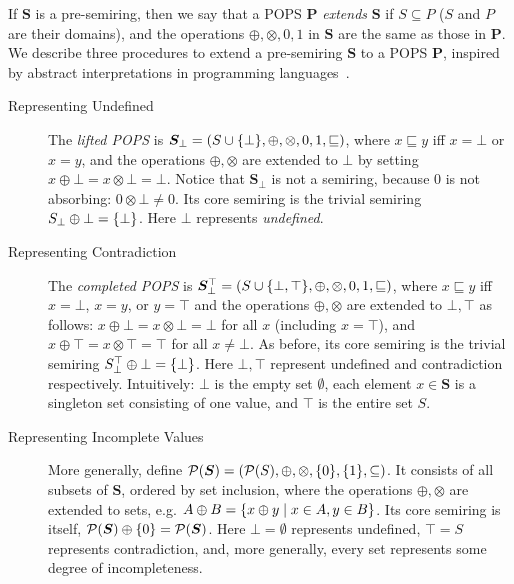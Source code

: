 If $\bm S$ is a pre-semiring, then we say that a POPS $\bm P$ {\em
extends} $\bm S$ if $S \subseteq P$ ($S$ and $P$ are their domains), and the
operations $\oplus, \otimes, 0, 1$ in $\bm S$ are the same as those in $\bm P$.
We describe three procedures to extend a pre-semiring $\bm S$ to a
POPS $\bm P$, inspired by abstract interpretations in programming
languages~\cite{DBLP:conf/popl/CousotC77}.

\begin{description}
\item[Representing Undefined] The {\em lifted POPS} is
  $\bm S_\bot = (S \cup \{\bot\}, \oplus, \otimes, 0, 1,
  \sqsubseteq)$, where $x \sqsubseteq y$ iff $x = \bot$ or $x = y$,
  and the operations $\oplus, \otimes$ are extended to $\bot$ by
  setting $x \oplus \bot = x \otimes \bot = \bot$.  Notice that
  $\bm S_\bot$ is not a semiring, because $0$ is not absorbing:
  $0 \otimes \bot \neq 0$.  Its core semiring is the trivial semiring
  $S_\bot \oplus \bot = \{\bot\}$.  Here $\bot$ represents {\em
    undefined}.

\item[Representing Contradiction] The {\em completed POPS} is
  $\bm S_\bot^\top = (S \cup \{\bot, \top\}, \oplus, \otimes, 0, 1,
  \sqsubseteq)$, where $x \sqsubseteq y$ iff $x=\bot$, $x=y$, or
  $y=\top$ and the operations $\oplus, \otimes$ are extended to
  $\bot, \top$ as follows: $x \oplus \bot = x \otimes \bot = \bot$ for
  all $x$ (including $x=\top$), and
  $x \oplus \top = x \otimes \top = \top$ for all $x \neq \bot$.  As
  before, its core semiring is the trivial semiring
  $S_\bot^\top \oplus \bot = \{\bot\}$.  Here $\bot, \top$ represent
  undefined and contradiction respectively.  Intuitively: $\bot$ is
  the empty set $\emptyset$, each element $x \in \bm S$ is a singleton
  set consisting of one value, and $\top$ is the entire set $S$.

\item[Representing Incomplete Values] More generally, define
  $\mathcal P(\bm S) = (\mathcal P(S), \oplus, \otimes, \{0\}, \{1\}, \subseteq)$.  It
  consists of all subsets of $\bm S$, ordered by set inclusion, where
  the operations $\oplus, \otimes$ are extended to sets, e.g.
  $A \oplus B = \{{x\oplus y}\mid{x \in A, y \in B}\}$.  Its core
  semiring is itself, $\mathcal P(\bm S) \oplus \{0\} = \mathcal P(\bm S)$.
  Here $\bot=\emptyset$ represents undefined, $\top=S$ represents
  contradiction, and, more generally, every set represents some degree
  of incompleteness.
\end{description}


